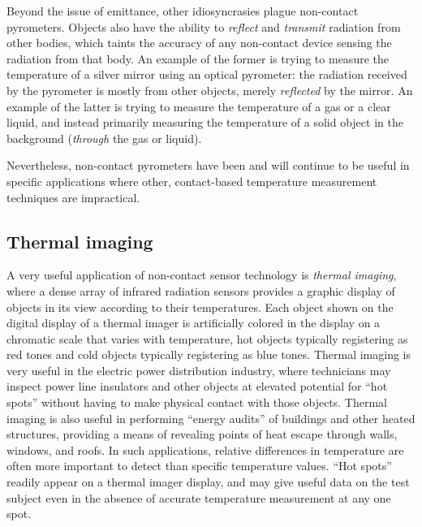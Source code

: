 Beyond the issue of emittance, other idiosyncrasies plague non-contact pyrometers.  Objects also have the ability to \textit{reflect} and \textit{transmit} radiation from other bodies, which taints the accuracy of any non-contact device sensing the radiation from that body.  An example of the former is trying to measure the temperature of a silver mirror using an optical pyrometer: the radiation received by the pyrometer is mostly from other objects, merely \textit{reflected} by the mirror.  An example of the latter is trying to measure the temperature of a gas or a clear liquid, and instead primarily measuring the temperature of a solid object in the background (\textit{through} the gas or liquid).

Nevertheless, non-contact pyrometers have been and will continue to be useful in specific applications where other, contact-based temperature measurement techniques are impractical.







\filbreak
\subsection{Thermal imaging}

A very useful application of non-contact sensor technology is \textit{thermal imaging}, where a dense array of infrared radiation sensors provides a graphic display of objects in its view according to their temperatures.  Each object shown on the digital display of a thermal imager is artificially colored in the display on a chromatic scale that varies with temperature, hot objects typically registering as red tones and cold objects typically registering as blue tones.  Thermal imaging is very useful in the electric power distribution industry, where technicians may inspect power line insulators and other objects at elevated potential for ``hot spots'' without having to make physical contact with those objects.  Thermal imaging is also useful in performing ``energy audits'' of buildings and other heated structures, providing a means of revealing points of heat escape through walls, windows, and roofs.  In such applications, relative differences in temperature are often more important to detect than specific temperature values.  ``Hot spots'' readily appear on a thermal imager display, and may give useful data on the test subject even in the absence of accurate temperature measurement at any one spot.  

